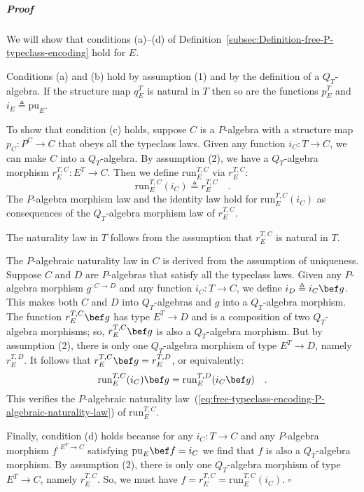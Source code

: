 \subparagraph{Proof}

We will show that conditions (a)–(d) of Definition~\ref{subsec:Definition-free-P-typeclass-encoding}
hold for $E$.

Conditions (a) and (b) hold by assumption (1) and by the definition
of a $Q_{T}$-algebra. If the structure map $q_{E}^{T}$ is natural
in $T$ then so are the functions $p_{E}^{T}$ and $i_{E}\triangleq\text{pu}_{E}$.

To show that condition (c) holds, suppose $C$ is a $P$-algebra with
a structure map $p_{C}:P^{C}\rightarrow C$ that obeys all the typeclass
laws. Given any function $i_{C}:T\rightarrow C$, we can make $C$
into a $Q_{T}$-algebra. By assumption (2), we have a $Q_{T}$-algebra
morphism $r_{E}^{T,C}:E^{T}\rightarrow C$. Then we define $\text{run}_{E}^{T,C}$
via $r_{E}^{T,C}$:
\[
\text{run}_{E}^{T,C}(i_{C})\triangleq r_{E}^{T,C}\quad.
\]
The $P$-algebra morphism law and the identity law hold for $\text{run}_{E}^{T,C}(i_{C})$
as consequences of the $Q_{T}$-algebra morphism law of $r_{E}^{T,C}$.

The naturality law in $T$ follows from the assumption that $r_{E}^{T,C}$
is natural in $T$. 

The $P$-algebraic naturality law in $C$ is derived from the assumption
of uniqueness. Suppose $C$ and $D$ are $P$-algebras that satisfy
all the typeclass laws. Given any $P$-algebra morphism $g^{:C\rightarrow D}$
and any function $i_{C}:T\rightarrow C$, we define $i_{D}\triangleq i_{C}\bef g$.
This makes both $C$ and $D$ into $Q_{T}$-algebras and $g$ into
a $Q_{T}$-algebra morphism. The function $r_{E}^{T,C}\bef g$ has
type $E^{T}\rightarrow D$ and is a composition of two $Q_{T}$-algebra
morphisms; so, $r_{E}^{T,C}\bef g$ is also a $Q_{T}$-algebra morphism.
But by assumption (2), there is only one $Q_{T}$-algebra morphism
of type $E^{T}\rightarrow D$, namely $r_{E}^{T,D}$. It follows that
$r_{E}^{T,C}\bef g=r_{E}^{T,D}$, or equivalently:
\[
\text{run}_{E}^{T,C}(i_{C})\bef g=\text{run}_{E}^{T,D}(i_{C}\bef g)\quad.
\]
 This verifies the $P$-algebraic naturality law~(\ref{eq:free-typeclass-encoding-P-algebraic-naturality-law})
of $\text{run}_{E}^{T,C}$.

Finally, condition (d) holds because for any $i_{C}:T\rightarrow C$
and any $P$-algebra morphism $f^{:E^{T}\rightarrow C}$ satisfying
$\text{pu}_{E}\bef f=i_{C}$ we find that $f$ is also a $Q_{T}$-algebra
morphism. By assumption (2), there is only one $Q_{T}$-algebra morphism
of type $E^{T}\rightarrow C$, namely $r_{E}^{T,C}$. So, we must
have $f=r_{E}^{T,C}=\text{run}_{E}^{T,C}(i_{C})$. $\square$

